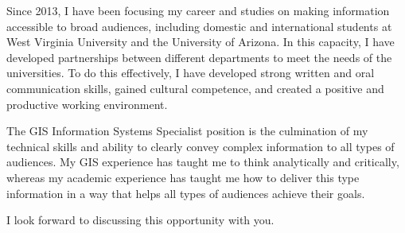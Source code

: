 \documentclass[12pt, letterpaper]{awesome-cv} %
\begin{document}
\begin{cvletter}
Since 2013, I have been focusing my career and studies on making information accessible to broad audiences, including domestic and international students at West Virginia University and the University of Arizona. In this capacity, I have developed partnerships between different departments to meet the needs of the universities. To do this effectively, I have developed strong written and oral communication skills, gained cultural competence, and created a positive and productive working environment. 

The GIS Information Systems Specialist position is the culmination of my technical skills and ability to clearly convey complex information to all types of audiences. My GIS experience has taught me to think analytically and critically, whereas my academic experience has taught me how to deliver this type information in a way that helps all types of audiences achieve their goals.

I look forward to discussing this opportunity with you.



\end{cvletter}


\makeletterclosing %
\end{document}
